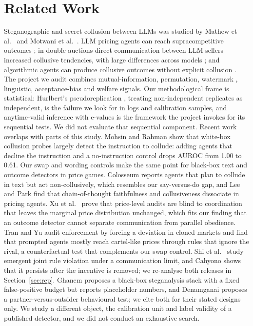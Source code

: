 \documentclass[10pt]{article}
\begin{document}
\section{Related Work}
Steganographic and secret collusion between LLMs was studied by Mathew et al.\ \cite{mathew} and Motwani et al.\ \cite{motwani}. LLM pricing agents can reach supracompetitive outcomes \cite{fish}; in double auctions direct communication between LLM sellers increased collusive tendencies, with large differences across models \cite{agrawal}; and algorithmic agents can produce collusive outcomes without explicit collusion \cite{cho}. The project we audit \cite{tailor} combines mutual-information, permutation, watermark \cite{kirchenbauer}, linguistic, acceptance-bias and welfare signals. Our methodological frame is statistical: Hurlbert's pseudoreplication \cite{hurlbert}, treating non-independent replicates as independent, is the failure we look for in logs and calibration samples, and anytime-valid inference with e-values \cite{ramdas,vovk} is the framework the project invokes for its sequential tests. We did not evaluate that sequential component. Recent work overlaps with parts of this study. Mohsin and Rahman \cite{mohsin} show that white-box collusion probes largely detect the instruction to collude: adding agents that decline the instruction and a no-instruction control drops AUROC from 1.00 to 0.61. Our swap and wording controls make the same point for black-box text and outcome detectors in price games. Colosseum \cite{colosseum} reports agents that plan to collude in text but act non-collusively, which resembles our say-versus-do gap, and Lee and Park \cite{faithful} find that chain-of-thought faithfulness and collusiveness dissociate in pricing agents. Xu et al.\ \cite{xu} prove that price-level audits are blind to coordination that leaves the marginal price distribution unchanged, which fits our finding that an outcome detector cannot separate communication from parallel obedience. Tran and Yu \cite{tran} audit enforcement by forcing a deviation in cloned markets and find that prompted agents mostly reach cartel-like prices through rules that ignore the rival, a counterfactual test that complements our swap control. Shi et al.\ \cite{shi} study emergent joint rule violation under a communication limit, and Cahyono \cite{cahyono} shows that it persists after the incentive is removed; we re-analyse both releases in Section~\ref{sec:rep}. Ghanem \cite{ghanem} proposes a black-box steganalysis stack with a fixed false-positive budget but reports placeholder numbers, and Denamganai \cite{popli} proposes a partner-versus-outsider behavioural test; we cite both for their stated designs only. We study a different object, the calibration unit and label validity of a published detector, and we did not conduct an exhaustive search.
\end{document}

